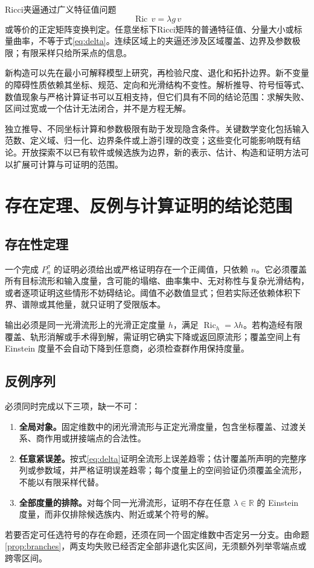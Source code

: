 \documentclass[11pt,a4paper]{article}
\theoremstyle{definition}
\newcommand{\Ric}{\operatorname{Ric}}
\begin{document}
Ricci夹逼通过广义特征值问题
\[
\Ric\,v=\lambda g\,v
\]
或等价的正定矩阵变换判定。任意坐标下Ricci矩阵的普通特征值、分量大小或标量曲率，不等于式\eqref{eq:delta}。连续区域上的夹逼还涉及区域覆盖、边界及参数极限；有限采样只给所采点的信息。

新构造可以先在最小可解释模型上研究，再检验尺度、退化和拓扑边界。新不变量的障碍性质依赖其坐标、规范、定向和光滑结构不变性。解析推导、符号恒等式、数值现象与严格计算证书可以互相支持，但它们具有不同的结论范围：求解失败、区间过宽或一个估计无法闭合，并不是方程无解。

独立推导、不同坐标计算和参数极限有助于发现隐含条件。关键数学变化包括输入范数、定义域、归一化、边界条件或上游引理的改变；这些变化可能影响既有结论。开放探索不以已有软件或候选族为边界，新的表示、估计、构造和证明方法可以扩展可计算与可证明的范围。

\section{存在定理、反例与计算证明的结论范围}\label{sec:acceptance}

\subsection{存在性定理}

一个完成 $P_n^\sigma$ 的证明必须给出或严格证明存在一个正阈值，只依赖 $n$。它必须覆盖所有目标流形和输入度量，含可能的塌缩、曲率集中、无对称性与复杂光滑结构，或者逐项证明这些情形不妨碍结论。阈值不必数值显式；但若实际还依赖体积下界、谱隙或其他量，就只证明了受限版本。

输出必须是同一光滑流形上的光滑正定度量 $h$，满足 $\Ric_h=\lambda h$。若构造经有限覆盖、轨形消解或手术得到解，需证明它确实下降或返回原流形；覆盖空间上有 Einstein 度量不会自动下降到任意商，必须检查群作用保持度量。

\subsection{反例序列}

必须同时完成以下三项，缺一不可：
\begin{enumerate}
\item \textbf{全局对象。}固定维数中的闭光滑流形与正定光滑度量，包含坐标覆盖、过渡关系、商作用或拼接端点的合法性。
\item \textbf{任意紧误差。}按式\eqref{eq:delta}证明全流形上误差趋零；估计覆盖所声明的完整序列或参数域，并严格证明误差趋零；每个度量上的空间验证仍须覆盖全流形，不能以有限采样代替。
\item \textbf{全部度量的排除。}对每个同一光滑流形，证明不存在任意 $\lambda\in\mathbb R$ 的 Einstein 度量，而非仅排除候选族内、附近或某个符号的解。
\end{enumerate}
若要否定可任选符号的存在命题，还须在同一个固定维数中否定另一分支。由命题\ref{prop:branches}，两支均失败已经否定全部非退化实区间，无须额外列举零端点或跨零区间。
\end{document}
